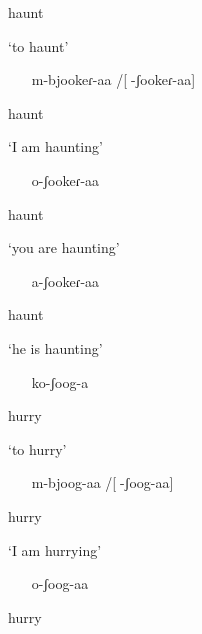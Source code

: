 \documentclass[output=paper]{langsci/langscibook}
\begin{document}
haunt

\textsc{‘}to haunt’

\begin{itemize}
\item [m-bjookeɾ-aa]/[-ʃookeɾ-aa]

\end{itemize}

haunt

\textsc{‘}I am haunting’

\begin{itemize}
\item [o-ʃookeɾ-aa]

\end{itemize}

haunt

\textsc{‘}you are haunting’

\begin{itemize}
\item [a-ʃookeɾ-aa]

\end{itemize}

haunt

\textsc{‘}he is haunting’

\begin{itemize}
\item [ko-ʃoog-a]

\end{itemize}

hurry

\textsc{‘}to hurry’

\begin{itemize}
\item [m-bjoog-aa]/[-ʃoog-aa]

\end{itemize}

hurry

\textsc{‘}I am hurrying’

\begin{itemize}
\item [o-ʃoog-aa]

\end{itemize}

hurry
\end{document}
